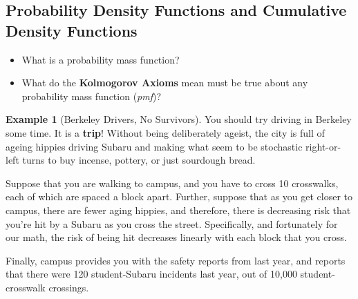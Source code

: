 \documentclass[
]{book}
\providecommand{\tightlist}{%
  \setlength{\itemsep}{0pt}\setlength{\parskip}{0pt}}
\theoremstyle{definition}
\theoremstyle{definition}
\newtheorem{example}{Example}[chapter]
\theoremstyle{definition}
\theoremstyle{definition}
\theoremstyle{remark}
\begin{document}
\hypertarget{probability-density-functions-and-cumulative-density-functions}{%
\subsection{Probability Density Functions and Cumulative Density Functions}\label{probability-density-functions-and-cumulative-density-functions}}

\begin{itemize}
\tightlist
\item
  What is a probability mass function?
\item
  What do the \textbf{Kolmogorov Axioms} mean must be true about any probability mass function (\emph{pmf})?
\end{itemize}

\begin{example}[Berkeley Drivers, No Survivors]

You should try driving in Berkeley some time. It is a \textbf{trip}! Without being deliberately ageist, the city is full of ageing hippies driving Subaru and making what seem to be stochastic right-or-left turns to buy incense, pottery, or just sourdough bread.

Suppose that you are walking to campus, and you have to cross 10 crosswalks, each of which are spaced a block apart. Further, suppose that as you get closer to campus, there are fewer aging hippies, and therefore, there is decreasing risk that you're hit by a Subaru as you cross the street. Specifically, and fortunately for our math, the risk of being hit decreases linearly with each block that you cross.

Finally, campus provides you with the safety reports from last year, and reports that there were 120 student-Subaru incidents last year, out of 10,000 student-crosswalk crossings.


\end{example}
\end{document}
